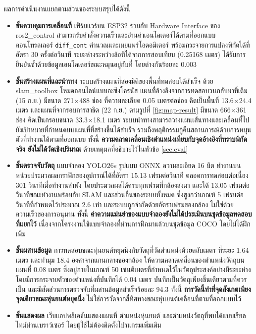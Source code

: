 \documentclass[a4paper,12pt]{report}
\begin{document}
ผลการดำเนินงานแยกตามส่วนของระบบสรุปได้ดังนี้

\begin{itemize}[leftmargin=1.25cm, itemsep=4pt, topsep=6pt]
    \item \textbf{ชั้นควบคุมการเคลื่อนที่} เฟิร์มแวร์บน ESP32 ร่วมกับ Hardware Interface
    ของ ros2\_control สามารถรับคำสั่งความเร็วและอ่านค่าเอนโคเดอร์ได้ตามที่ออกแบบ
    คอนโทรลเลอร์ \texttt{diff\_cont} คำนวณและเผยแพร่โอดอมิเตอร์
    พร้อมกระจายการแปลงพิกัดได้ที่อัตรา 30 ครั้งต่อวินาที
    ระยะห่างระหว่างล้อที่ได้จากการสอบเทียบ (0.25168 เมตร)
    ได้รับการยืนยันซ้ำด้วยข้อมูลเอนโคเดอร์ขณะหมุนอยู่กับที่ โดยต่างกันร้อยละ 0.003

    \item \textbf{ชั้นสร้างแผนที่และนำทาง} ระบบสร้างแผนที่สองมิติของพื้นที่ทดสอบได้สำเร็จ
    ด้วย slam\_toolbox โหมดออนไลน์แบบอะซิงโครนัส
    แผนที่อ้างอิงจากการทดสอบวนกลับมาที่เดิม (15 ก.ย.) มีขนาด 271$\times$488 ช่อง
    ที่ความละเอียด 0.05 เมตรต่อช่อง คิดเป็นพื้นที่ 13.6$\times$24.4 เมตร
    และแผนที่จากรอบการสาธิต (22 ก.ย.) ตามรูปที่ \ref{fig:map-result} มีขนาด 666$\times$361 ช่อง
    คิดเป็นกรอบขนาด 33.3$\times$18.1 เมตร
    ระบบนำทางสามารถวางแผนเส้นทางและเคลื่อนที่ไปยังเป้าหมายที่กำหนดบนแผนที่ที่สร้างขึ้นได้สำเร็จ
    รวมถึงพฤติกรรมกู้คืนสถานการณ์ด้วยการหมุนตัวที่ทำงานได้ตามที่ออกแบบ
    ทั้งนี้ \textbf{ความคลาดเคลื่อนเชิงตำแหน่งเทียบกับจุดอ้างอิงที่ทราบพิกัดจริง
    ยังไม่ได้วัดเชิงปริมาณ} ด้วยเหตุผลที่อธิบายไว้ในหัวข้อ \ref{sec:eval}

    \item \textbf{ชั้นตรวจจับวัตถุ} แบบจำลอง YOLO26s รูปแบบ ONNX ความละเอียด 16 บิต
    ทำงานบนหน่วยประมวลผลกราฟิกของอุปกรณ์ได้ที่อัตรา 15.13 เฟรมต่อวินาที
    ตลอดการทดสอบต่อเนื่อง 301 วินาทีเมื่อทำงานลำพัง โดยประมวลผลได้ครบทุกเฟรมที่กล้องส่งมา
    และได้ 13.05 เฟรมต่อวินาทีขณะทำงานพร้อมกับ SLAM และส่วนอื่นของระบบทั้งหมด
    ซึ่งสูงกว่าเกณฑ์ 5 เฟรมต่อวินาทีที่กำหนดไว้ประมาณ 2.6 เท่า
    และระบบถูกจำกัดด้วยอัตราเฟรมของกล้อง ไม่ใช่ด้วยความเร็วของการอนุมาน
    ทั้งนี้ \textbf{ค่าความแม่นยำของแบบจำลองยังไม่ได้ประเมินบนชุดข้อมูลทดสอบที่แยกไว้}
    เนื่องจากโครงงานใช้แบบจำลองที่ผ่านการฝึกมาแล้วบนชุดข้อมูล COCO โดยไม่ได้ฝึกเพิ่ม

    \item \textbf{ชั้นผสานข้อมูล} การทดสอบขณะหุ่นยนต์หยุดนิ่งกับวัตถุที่วัดตำแหน่งด้วยตลับเมตร
    ที่ระยะ 1.64 เมตร และทำมุม 18.4 องศาจากแกนกลางของกล้อง
    ให้ความคลาดเคลื่อนของตำแหน่งวัตถุบนแผนที่ 0.08 เมตร
    ซึ่งอยู่ภายในเกณฑ์ 50 เซนติเมตรที่กำหนดไว้ในวัตถุประสงค์อย่างมีระยะห่าง
    โดยมีการกระจายตัวของตำแหน่งที่บันทึกได้ 0.04 เมตร
    บันทึกเป็นวัตถุเพียงชิ้นเดียวตามที่ควรเป็น
    และมีสัดส่วนการตรวจจับที่ผสานข้อมูลสำเร็จร้อยละ 94.3
    ทั้งนี้ \textbf{การวัดนี้ทำที่จุดสังเกตเพียงจุดเดียวขณะหุ่นยนต์หยุดนิ่ง}
    ไม่ใช่การวัดจากสี่ทิศทางขณะหุ่นยนต์เคลื่อนที่ตามที่ออกแบบไว้

    \item \textbf{ชั้นแสดงผล} เว็บแอปพลิเคชันแสดงแผนที่ ตำแหน่งหุ่นยนต์
    และตำแหน่งวัตถุที่พบได้แบบเรียลไทม์ผ่านเบราว์เซอร์
    โดยผู้ใช้ไม่ต้องติดตั้งโปรแกรมเพิ่มเติม
\end{itemize}
\end{document}
